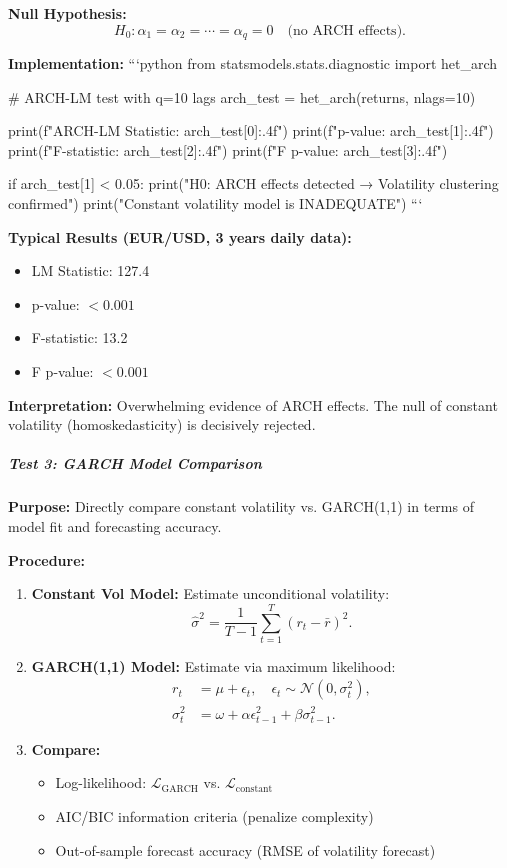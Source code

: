 \textbf{Null Hypothesis:}
\begin{equation}
	H_0: \alpha_1 = \alpha_2 = \cdots = \alpha_q = 0 \quad \text{(no ARCH effects)}.
\end{equation}

\textbf{Implementation:}
```python
from statsmodels.stats.diagnostic import het_arch

# ARCH-LM test with q=10 lags
arch_test = het_arch(returns, nlags=10)

print(f"ARCH-LM Statistic: {arch_test[0]:.4f}")
print(f"p-value: {arch_test[1]:.4f}")
print(f"F-statistic: {arch_test[2]:.4f}")
print(f"F p-value: {arch_test[3]:.4f}")

if arch_test[1] < 0.05:
print("\nREJECT H0: ARCH effects detected → Volatility clustering confirmed")
print("Constant volatility model is INADEQUATE")
```

\textbf{Typical Results (EUR/USD, 3 years daily data):}

\begin{itemize}
	\item LM Statistic: 127.4
	\item p-value: $< 0.001$
	\item F-statistic: 13.2
	\item F p-value: $< 0.001$
\end{itemize}

\textbf{Interpretation:} Overwhelming evidence of ARCH effects. The null of constant volatility (homoskedasticity) is decisively rejected.

\subparagraph{Test 3: GARCH Model Comparison}

\textbf{Purpose:} Directly compare constant volatility vs. GARCH(1,1) in terms of model fit and forecasting accuracy.

\textbf{Procedure:}

\begin{enumerate}
	\item \textbf{Constant Vol Model:} Estimate unconditional volatility:
	\begin{equation}
		\hat{\sigma}^2 = \frac{1}{T-1} \sum_{t=1}^T (r_t - \bar{r})^2.
	\end{equation}
	
	\item \textbf{GARCH(1,1) Model:} Estimate via maximum likelihood:
	\begin{align}
		r_t &= \mu + \epsilon_t, \quad \epsilon_t \sim \mathcal{N}(0, \sigma_t^2), \\
		\sigma_t^2 &= \omega + \alpha \epsilon_{t-1}^2 + \beta \sigma_{t-1}^2.
	\end{align}
	
	\item \textbf{Compare:}
	\begin{itemize}
		\item Log-likelihood: $\mathcal{L}_{\text{GARCH}}$ vs. $\mathcal{L}_{\text{constant}}$
		\item AIC/BIC information criteria (penalize complexity)
		\item Out-of-sample forecast accuracy (RMSE of volatility forecast)
	\end{itemize}
\end{enumerate}

